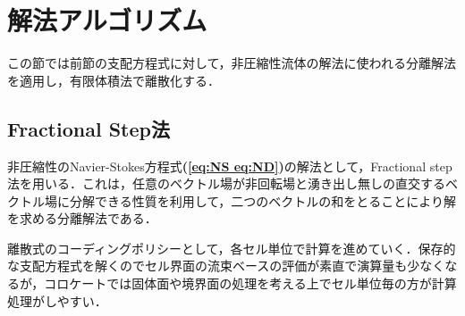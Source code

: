 %
\section{解法アルゴリズム}
\label{sec:Algorithm NS}
この節では前節の支配方程式に対して，非圧縮性流体の解法に使われる分離解法を適用し，有限体積法で離散化する．

\subsection{Fractional Step法}
\label{sec:fractional step}
非圧縮性のNavier-Stokes方程式\textbf{(\ref{eq:NS eq:ND})}の解法として，Fractional step法を用いる．これは，任意のベクトル場が非回転場と湧き出し無しの直交するベクトル場に分解できる性質を利用して，二つのベクトルの和をとることにより解を求める分離解法である．

離散式のコーディングポリシーとして，各セル単位で計算を進めていく．保存的な支配方程式を解くのでセル界面の流束ベースの評価が素直で演算量も少なくなるが，コロケートでは固体面や境界面の処理を考える上でセル単位毎の方が計算処理がしやすい．

%
